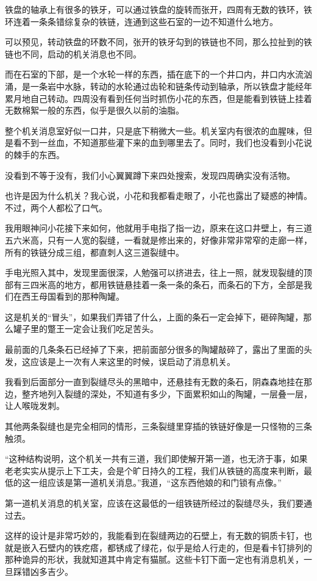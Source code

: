 铁盘的轴承上有很多的铁牙，可以通过铁盘的旋转而张开，四周有无数的铁环，铁环连着一条条错综复杂的铁链，连通到这些石室的一边不知道什么地方。

可以预见，转动铁盘的环数不同，张开的铁牙勾到的铁链也不同，那么拉扯到的铁链也不同，启动的机关消息也不同。

而在石室的下部，是一个水轮一样的东西，插在底下的一个井口内，井口内水流汹涌，是一条岩中水脉，转动的水轮通过齿轮和链条传动到轴承，所以铁盘才能经年累月地自己转动。四周没有看到任何当时抓伤小花的东西，但是能看到铁链上挂着无数棉絮一般的东西，似乎是很久以前的油脂。

整个机关消息室好似一口井，只是底下稍微大一些。机关室内有很浓的血腥味，但是看不到一丝血，不知道那些灌下来的血到哪里去了。同时，我们也没看到小花说的棘手的东西。

没看到不等于没有，我们小心翼翼蹲下来四处搜索，发现四周确实没有活物。

也许是因为什么机关？我心说，小花和我都看走眼了，小花也露出了疑惑的神情。不过，两个人都松了口气。

我用眼神问小花接下来如何，他就用手电指了指一边，原来在这口井壁上，有三道五六米高，只有一人宽的裂缝，一看就是修出来的，好像非常非常窄的走廊一样，所有的铁链分成三组，都直刺人这三道裂缝中。

手电光照入其中，发现里面很深，人勉强可以挤进去，往上一照，就发现裂缝的顶部有三四米高的地方，都用铁链悬挂着一条一条的条石，而条石的下方，全部是我们在西王母国看到的那种陶罐。

这是机关的“冒头”，如果我们弄错了什么，上面的条石一定会掉下，砸碎陶罐，那么罐子里的蹩王一定会让我们吃足苦头。

最前面的几条条石已经掉了下来，把前面部分很多的陶罐敲碎了，露出了里面的头发，这应该是上一次有人来这里的时候，误启动了消息机关。

我看到后面部分一直到裂缝尽头的黑暗中，还悬挂有无数的条石，阴森森地挂在那边，整齐地列入裂缝的深处，不知道有多少，下面累积如山的陶罐，一层叠一层，让人喉咙发刺。

其他两条裂缝也是完全相同的情形，三条裂缝里穿插的铁链好像是一只怪物的三条触须。

“这种结构说明，这个机关一共有三道，我们即使解开第一道，也无济于事，如果老老实实从提示上下工夫，会是个旷日持久的工程，我们从铁链的高度来判断，最低的这一组应该是第一道机关消息。”我道，“这东西他娘的和门锁有点像。”

第一道机关消息的机关室，应该在这最低的一组铁链所经过的裂缝尽头，我们要通过去。

这样的设计是非常巧妙的，我能看到在裂缝两边的石壁上，有无数的铜质卡钉，也就是嵌入石壁内的铁疙瘩，都锈成了绿花，似乎是给人行走的，但是看卡钉排列的那种诡异的形状，我就知道其中肯定有猫腻。这些卡钉下面一定也有消息机关，一旦踩错凶多吉少。

